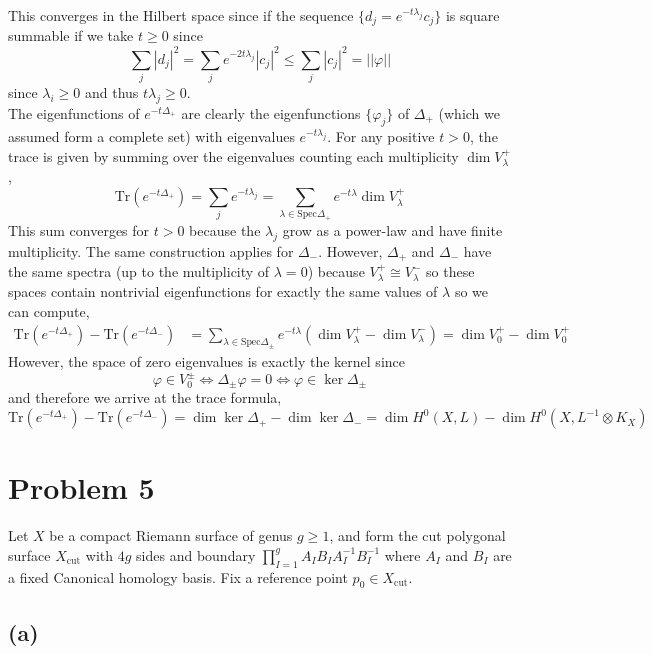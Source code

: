 \documentclass[12pt]{extarticle}
\newcommand{\Tr}[1]{\mathrm{Tr}\left( #1 \right)}
\theoremstyle{definition}
\newcommand{\Xcut}{X_{\text{cut}}}
\begin{document}
This converges in the Hilbert space since if the sequence $\{ d_j = e^{- t \lambda_j} c_j \}$ is square summable if we take $t \ge 0$ since
\[ \sum_{j} |d_j|^2 = \sum_{j} e^{-2 t \lambda_j}  |c_j|^2 \le \sum_j |c_j|^2 = || \varphi || \]
since $\lambda_i \ge 0$ and thus $t \lambda_j \ge 0$. 
\bigskip\\
The eigenfunctions of $e^{- t \Delta_{+}}$ are clearly the eigenfunctions $\{ \varphi_j \}$ of $\Delta_{+}$ (which we assumed form a complete set) with eigenvalues $e^{- t \lambda_j}$. For any positive $t > 0$, the trace is given by summing over the eigenvalues counting each multiplicity $\dim{V^{+}_{\lambda}}$,
\[ \Tr{e^{- t \Delta_{+}}} = \sum_{j} e^{- t \lambda_j} = \sum_{\lambda \in \mathrm{Spec}{\Delta_{+}}} e^{- t \lambda} \dim{V_{\lambda}^{+}} \]
This sum converges for $t > 0$ because the $\lambda_j$ grow as a power-law and have finite multiplicity. 
The same construction applies for $\Delta_{-}$. However, $\Delta_{+}$ and $\Delta_{-}$ have the same spectra (up to the multiplicity of $\lambda = 0$) because $V^{+}_{\lambda} \cong V^{-}_{\lambda}$ so these spaces contain nontrivial eigenfunctions for exactly the same values of $\lambda$ so we can compute,
\begin{align*}
\Tr{e^{- t \Delta_{+}}} - \Tr{e^{- t \Delta_{-}}} & = \sum_{\lambda \in \mathrm{Spec} \Delta_{\pm}} e^{- t \lambda} \left( \dim{V^{+}_{\lambda}} - \dim{V^{-}_\lambda} \right) = \dim{V^{+}_0} - \dim{V^{+}_0} 
\end{align*}
However, the space of zero eigenvalues is exactly the kernel since \[ \varphi \in V^{\pm}_0 \iff \Delta_{\pm} \varphi = 0 \iff \varphi \in \ker{\Delta_{\pm}} \]
and therefore we arrive at the trace formula,
\[ \Tr{e^{- t \Delta_{+}}} - \Tr{e^{- t \Delta_{-}}} = \dim{\ker{\Delta_+}} - \dim{\ker{\Delta_{-}}} = \dim{H^0(X, L)} - \dim{H^0(X, L^{-1} \otimes K_X)} \] 


\section*{Problem 5}

Let $X$ be a compact Riemann surface of genus $g \ge 1$, and form the cut polygonal surface $\Xcut$ with $4g$ sides and boundary $\prod_{I = 1}^g A_I B_I A_I^{-1} B_I^{-1}$ where $A_I$ and $B_I$ are a fixed Canonical homology basis. Fix a reference point $p_0 \in \Xcut$. 

\subsection*{(a)}
 
\end{document}
